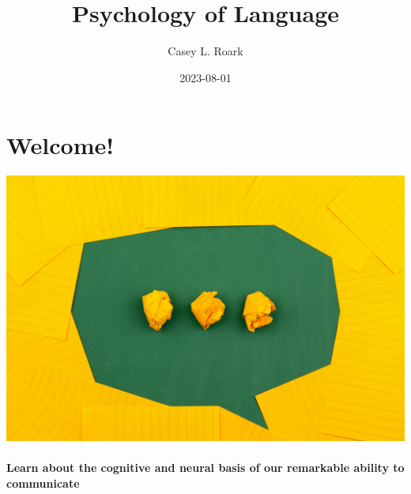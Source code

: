\documentclass[
  letterpaper,
  DIV=11,
  numbers=noendperiod]{scrreprt}
\title{Psychology of Language}
\author{Casey L. Roark}
\date{2023-08-01}
\renewcommand*\contentsname{Table of contents}
\newcommand\contentsname{Table of contents}
\begin{document}
\maketitle
\ifdefined\Shaded\renewenvironment{Shaded}{\begin{tcolorbox}[boxrule=0pt, breakable, sharp corners, enhanced, frame hidden, interior hidden, borderline west={3pt}{0pt}{shadecolor}]}{\end{tcolorbox}}\fi

\renewcommand*\contentsname{Table of contents}
{
\hypersetup{linkcolor=}
\setcounter{tocdepth}{2}
\tableofcontents
}

\hypertarget{welcome}{%
\chapter*{Welcome!}\label{welcome}}


\includegraphics{images/volodymyr-hryshchenko-V5vqWC9gyEU-unsplash.jpg}

\hypertarget{learn-about-the-cognitive-and-neural-basis-of-our-remarkable-ability-to-communicate}{%
\subsubsection*{Learn about the cognitive and neural basis of our
remarkable ability to
communicate}\label{learn-about-the-cognitive-and-neural-basis-of-our-remarkable-ability-to-communicate}}
\end{document}

